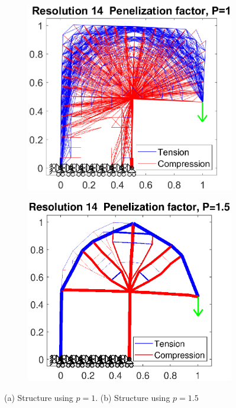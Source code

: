 \begin{figure}[h!]
    \centering
\begin{subfigure}[t]{.45\textwidth}
    \centering
    \includegraphics[trim=.0cm .0cm .0cm .0cm, clip=true,width=1\linewidth]{Figures/Plots/flex14x14c100Ex42_p=1-0.eps}
    \caption{}
    \label{fig:14x14p1}
\end{subfigure}
\begin{subfigure}[t]{.45\textwidth}
    \centering
    \includegraphics[trim=.0cm 0.0cm .0cm .0cm, clip=true,width=1\linewidth]{Figures/Plots/flex14x14c100Ex42_p=1-5.eps}
    \caption{}
    \label{fig:14x14p15}
\end{subfigure}
\caption{ (a) Structure using $p=1$.  (b) Structure using $p=1.5$}
\end{figure}

